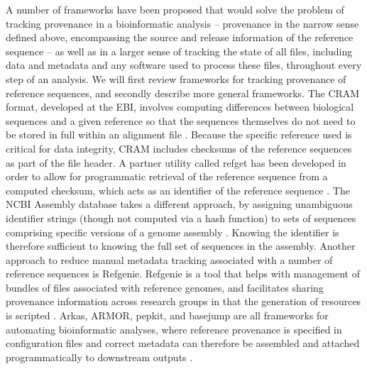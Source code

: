 \documentclass[12pt]{article} \usepackage[utf8]{inputenc}
\begin{document}
A number of frameworks have been proposed that would solve the problem
of tracking provenance in a bioinformatic analysis -- provenance in
the narrow sense defined above, encompassing the source and release
information of the reference sequence -- as well as in a larger sense
of tracking the state of all files, including data and metadata and
any software used to process these files, throughout every step of an
analysis. We will first review frameworks for tracking provenance of
reference sequences, and secondly describe more general
frameworks. The CRAM format, developed at the EBI, involves computing
differences between biological sequences and a given reference so that
the sequences themselves do not need to be stored in full within an
alignment file \citep{cram}. Because the specific reference used is
critical for data integrity, CRAM includes checksums of the reference
sequences as part of the file header. A partner utility called refget
has been developed in order to allow for programmatic retrieval of the
reference sequence from a computed checksum, which acts as an
identifier of the reference sequence \citep{refget}. The NCBI Assembly
database takes a different approach, by assigning unambiguous
identifier strings (though not computed via a hash function) to sets
of sequences comprising specific versions of a genome assembly
\citep{ncbi-assembly}. Knowing the identifier is therefore sufficient
to knowing the full set of sequences in the assembly.
Another approach to reduce manual metadata tracking associated with a number of
reference sequences is Refgenie. Refgenie is a tool that helps with
management of bundles of files associated with reference genomes, and
facilitates sharing provenance information across research groups in
that the generation of resources is scripted \citep{refgenie}. Arkas,
ARMOR, pepkit, and basejump are all frameworks for automating
bioinformatic analyses, where reference provenance is specified in
configuration files and correct metadata can therefore be assembled
and attached programmatically to downstream outputs
\citep{arkas,Orjuelag2019,pepkit,basejump}.
\end{document}
